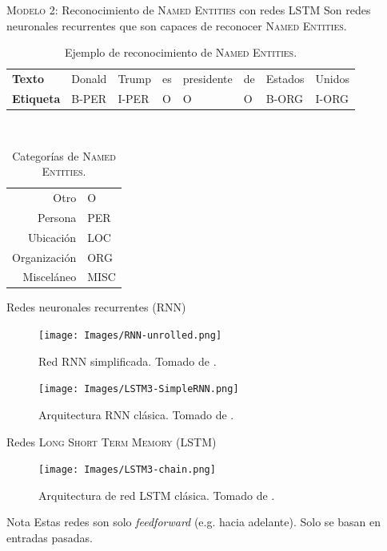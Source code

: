 \documentclass[10pt]{beamer}
\begin{document}
\begin{frame}{\textsc{Modelo 2:} Reconocimiento de \textsc{Named Entities} con redes \textsc{LSTM}}
  Son redes neuronales recurrentes que son capaces de reconocer \textsc{Named Entities}.
  \begin{table}
    \centering
    \begin{tabular}{l|lllllll} 
      \textbf{Texto}    & Donald   & Trump & es & presidente & de & Estados & Unidos \\
      \textbf{Etiqueta} & B-PER    & I-PER & O  & O          & O  & B-ORG   & I-ORG
    \end{tabular}
    \\ [1em]
    \caption{Ejemplo de reconocimiento de \textsc{Named Entities}.}
    \label{table:namedent-example}
  \end{table}

  \begin{table}
    \centering
    \begin{tabular}{rl} 
      Otro & O \\
      Persona & PER \\
      Ubicación & LOC \\
      Organización & ORG \\
      Misceláneo & MISC \\
    \end{tabular}
    \caption{Categorías de \textsc{Named Entities}.}
    \label{table:namedent-categories}
  \end{table}
\end{frame}

\begin{frame}{Redes neuronales recurrentes (\textsc{RNN})}
  \begin{figure}[H]
    \centering
    \texttt{[image: Images/RNN-unrolled.png]}
    \caption[Red \textsc{RNN} simplificada]{Red \textsc{RNN} simplificada. Tomado de \cite{understanding-lstm}.}
    \label{fig:rnn-classic-simple}
  \end{figure}

  \begin{figure}[H]
    \centering
    \texttt{[image: Images/LSTM3-SimpleRNN.png]}
    \caption[Arquitectura \textsc{RNN} clásica]{Arquitectura \textsc{RNN} clásica. Tomado de \cite{understanding-lstm}.}
    \label{fig:rnn-classic}
  \end{figure}
\end{frame}

\begin{frame}{Redes \textsc{Long Short Term Memory (LSTM)}}
  \begin{figure}[H]
    \centering
    \texttt{[image: Images/LSTM3-chain.png]}
    \caption[Arquitectura de red \textsc{LSTM} clásica]{Arquitectura de red \textsc{LSTM} clásica. Tomado de \cite{understanding-lstm}.}
    \label{fig:lstm-classic}
  \end{figure}

  \begin{alertblock}{Nota}
    Estas redes son solo \emph{feedforward} (e.g. hacia adelante). Solo se basan en entradas pasadas.
  \end{alertblock}
\end{frame}
\end{document}
